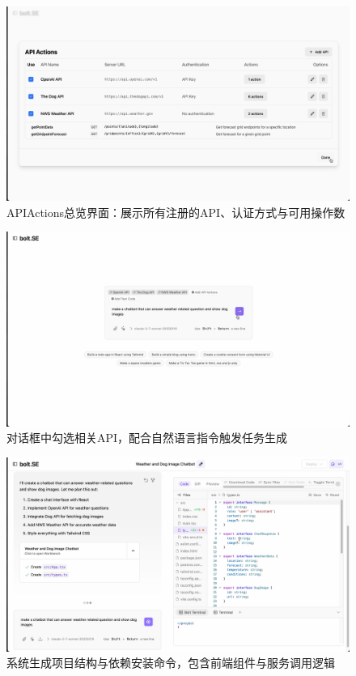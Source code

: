 \begin{figure}[htbp]
  \centering
  \includegraphics[width=\textwidth]{figures/screenshots/api-actions/demo_actions_table.png}
  \caption{APIActions总览界面：展示所有注册的API、认证方式与可用操作数}
  \label{fig:demo_table}
\end{figure}

\begin{figure}[htbp]
  \centering
  \includegraphics[width=\textwidth]{figures/screenshots/api-actions/demo_prompt_tags.png}
  \caption{对话框中勾选相关API，配合自然语言指令触发任务生成}
  \label{fig:demo_prompt}
\end{figure}

\begin{figure}[htbp]
  \centering
  \includegraphics[width=\textwidth]{figures/screenshots/api-actions/demo_plan_files.png}
  \caption{系统生成项目结构与依赖安装命令，包含前端组件与服务调用逻辑}
  \label{fig:demo_plan}
\end{figure}

